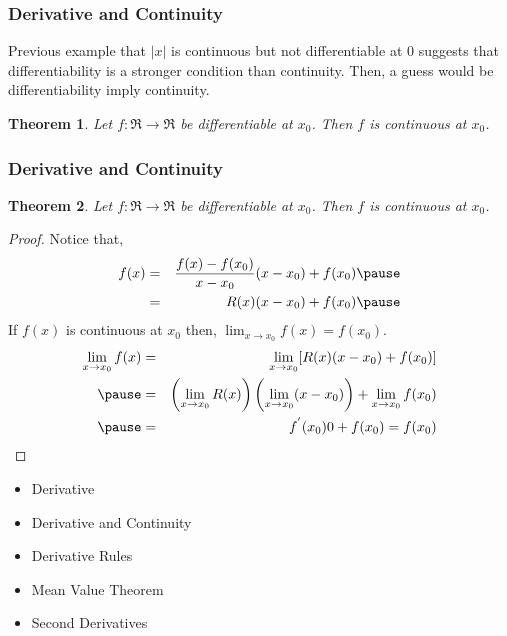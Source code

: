\documentclass{beamer}
\newtheorem{thm}{Theorem}
\numberwithin{equation}{section}
\begin{document}
\begin{frame}
\frametitle{Derivative and Continuity}

Previous example that $|x|$ is continuous but not differentiable at 0 suggests that differentiability is a stronger condition than continuity. Then, a guess would be differentiability imply continuity.

\begin{thm} Let $f:\Re \rightarrow \Re$ be differentiable at $x_{0}$.  Then $f$ is continuous at $x_{0}$.
\end{thm} \pause

\end{frame}


\begin{frame}
\frametitle{Derivative and Continuity}

\begin{thm} Let $f:\Re \rightarrow \Re$ be differentiable at $x_{0}$.  Then $f$ is continuous at $x_{0}$.
\end{thm} \pause

\begin{proof}
Notice that, \pause 
\begin{eqnarray}
f(x) & = & \frac{ f(x) - f(x_{0})}{x- x_{0}} (x - x_{0} ) + f(x_{0} ) \nonumber \pause  \\
& = & R(x) (x - x_{0} ) + f(x_{0} ) \nonumber \pause 
	\end{eqnarray}
If $f(x)$ is continuous at $x_{0}$ then, $\lim_{x\rightarrow x_{0}} f(x) = f(x_{0})$. \pause 
\begin{eqnarray}
\lim_{x\rightarrow x_{0}} f(x) & = & \lim_{x\rightarrow x_{0} } [R(x) (x - x_{0} ) + f(x_{0}) ] \nonumber \\ \pause 
& = & \left(\lim_{x\rightarrow x_{0} } R(x) \right)\left(\lim_{x\rightarrow x_{0}} (x - x_{0}) \right)  + \lim_{x\rightarrow x_{0}} f(x_{0} ) \nonumber \\ \pause 
& = & f^{'}(x_{0} ) 0 + f(x_{0})  = f(x_{0} ) \nonumber
	\end{eqnarray}

\end{proof}

\end{frame}



\begin{frame}

\begin{itemize}
\item \textcolor{mygray}{Derivative}
\item \textcolor{mygray}{Derivative and Continuity}
\item \textcolor{myblack}{Derivative Rules}
\item \textcolor{mygray}{Mean Value Theorem}
\item \textcolor{mygray}{Second Derivatives}
\end{itemize}

\end{frame}
\end{document}
